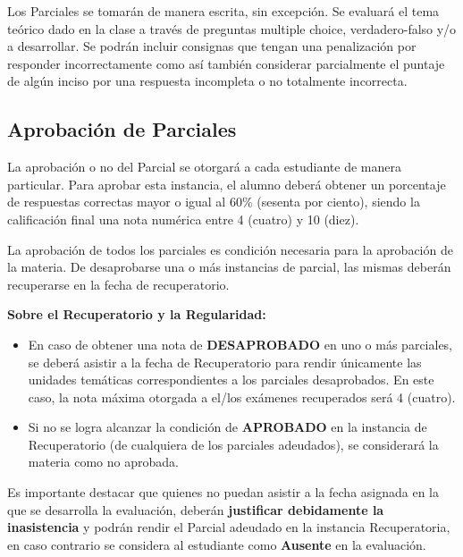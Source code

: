 \documentclass[10pt]{article}
\begin{document}
Los Parciales se tomarán de manera escrita, sin excepción. Se evaluará el tema teórico dado en la clase a través de preguntas multiple choice, verdadero-falso y/o a desarrollar. Se podrán incluir consignas que tengan una penalización por responder incorrectamente como así también considerar parcialmente el puntaje de algún inciso por una respuesta incompleta o no totalmente incorrecta. 

\subsection{Aprobación de Parciales}
\label{sec:aprobacion_Parciales}

La aprobación o no del Parcial se otorgará a cada estudiante de manera particular. Para aprobar esta instancia, el alumno deberá obtener un porcentaje de respuestas correctas mayor o igual al 60\% (sesenta por ciento), siendo la calificación final una nota numérica entre 4 (cuatro) y 10 (diez).

La aprobación de todos los parciales es condición necesaria para la aprobación de la materia. De desaprobarse una o más instancias de parcial, las mismas deberán recuperarse en la fecha de recuperatorio. 

\vspace{0.5cm}

\textbf{Sobre el Recuperatorio y la Regularidad:}
\begin{itemize}
\item En caso de obtener una nota de \textbf{DESAPROBADO} en uno o más parciales, se deberá asistir a la fecha de Recuperatorio para rendir únicamente las unidades temáticas correspondientes a los parciales desaprobados. En este caso, la nota máxima otorgada a el/los exámenes recuperados será 4 (cuatro).

\item Si no se logra alcanzar la condición de \textbf{APROBADO} en la instancia de Recuperatorio (de cualquiera de los parciales adeudados), se considerará la materia como no aprobada.
\end{itemize}

 Es importante destacar que quienes no puedan asistir a la fecha asignada en la que se desarrolla la evaluación, deberán \textbf{justificar debidamente la inasistencia} y podrán rendir el Parcial adeudado en la instancia Recuperatoria, en caso contrario se considera al estudiante como \textbf{Ausente} en la evaluación.
\end{document}
